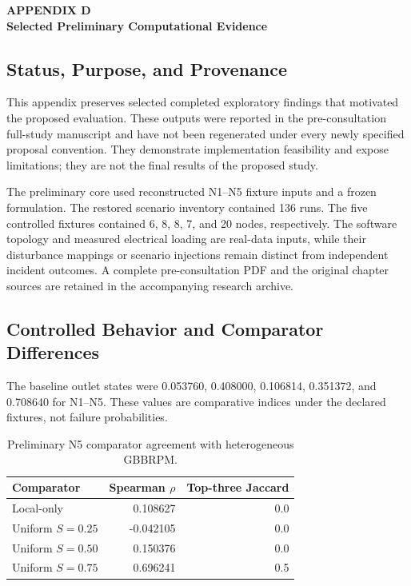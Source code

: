 \clearpage
\thispagestyle{empty}
\label{app:preliminary}

{
\centering
\textbf{APPENDIX D}\\
\textbf{Selected Preliminary Computational Evidence}\par
}
\vspace{\baselineskip}

\subsection{Status, Purpose, and Provenance}

This appendix preserves selected completed exploratory findings that
motivated the proposed evaluation. These outputs were reported in the
pre-consultation full-study manuscript and have not been regenerated
under every newly specified proposal convention. They demonstrate
implementation feasibility and expose limitations; they are not the final
results of the proposed study.

The preliminary core used reconstructed N1--N5 fixture inputs and
a frozen formulation. The restored scenario inventory contained 136 runs.
The five controlled fixtures contained 6, 8, 8, 7, and 20 nodes, respectively.
The software topology and measured electrical loading are real-data
inputs, while their disturbance mappings or scenario injections remain
distinct from independent incident outcomes. A complete pre-consultation
PDF and the original chapter sources are retained in the accompanying
research archive.

\subsection{Controlled Behavior and Comparator Differences}

The baseline outlet states were 0.053760, 0.408000, 0.106814, 0.351372,
and 0.708640 for N1--N5. These values are comparative indices under the
declared fixtures, not failure probabilities.

\begin{table}[H]
\centering
\caption{Preliminary N5 comparator agreement with heterogeneous GBBRPM.}
\label{tab:prelim-comparators}
\small
\begin{tabularx}{\textwidth}{@{}Lrr@{}}
\toprule
Comparator & Spearman $\rho$ & Top-three Jaccard\\
\midrule
Local-only & 0.108627 & 0.0\\
Uniform $S=0.25$ & -0.042105 & 0.0\\
Uniform $S=0.50$ & 0.150376 & 0.0\\
Uniform $S=0.75$ & 0.696241 & 0.5\\
\bottomrule
\end{tabularx}
\end{table}

